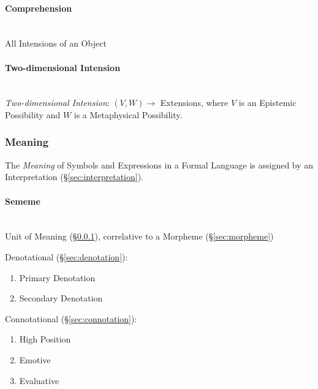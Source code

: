 \paragraph{Comprehension}\label{sec:comprehension}
\hfill \\

All Intensions of an Object



\paragraph{Two-dimensional Intension}\label{sec:twodimensional_intension}
\hfill \\

\emph{Two-dimensional Intension}: $(V,W) \rightarrow$ Extensions,
where $V$ is an Epistemic Possibility and $W$ is a Metaphysical
Possibility.



\subsubsection{Meaning}\label{sec:meaning}

The \emph{Meaning} of Symbols and Expressions in a Formal Language is
assigned by an Interpretation (\S\ref{sec:interpretation}).



\paragraph{Sememe}\label{sec:sememe}
\hfill \\

Unit of Meaning (\S\ref{sec:meaning}), correlative to a Morpheme
(\S\ref{sec:morpheme})

Denotational (\S\ref{sec:denotation}):

\begin{enumerate}
  \item Primary Denotation
  \item Secondary Denotation
\end{enumerate}

Connotational (\S\ref{sec:connotation}):

\begin{enumerate}
  \item High Position
  \item Emotive
  \item Evaluative
\end{enumerate}



